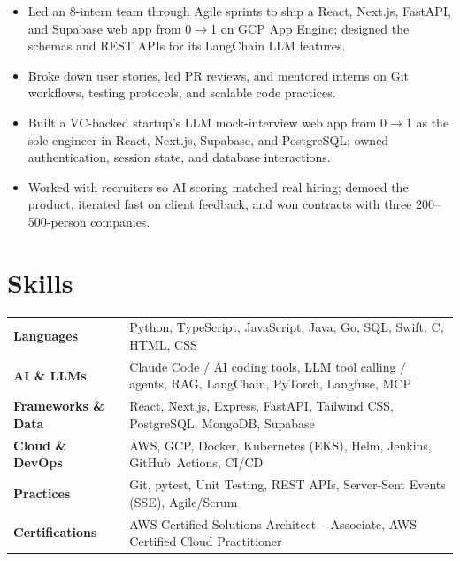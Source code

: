 \documentclass[11pt, letterpaper]{article}
\begin{document}
\vspace{1pt}
\begin{itemize}
  \item Led an 8-intern team through Agile sprints to ship a React, Next.js, FastAPI, and Supabase web app from 0$\to$1 on GCP App Engine; designed the schemas and REST APIs for its LangChain LLM features.
  \item Broke down user stories, led PR reviews, and mentored interns on Git workflows, testing protocols, and scalable code practices.
\end{itemize}

\begin{itemize}
  \item Built a VC-backed startup's LLM mock-interview web app from 0$\to$1 as the sole engineer in React, Next.js, Supabase, and PostgreSQL; owned authentication, session state, and database interactions.
  \item Worked with recruiters so AI scoring matched real hiring; demoed the product, iterated fast on client feedback, and won contracts with three 200--500-person companies.
\end{itemize}

\section{Skills}
\begin{tabularx}{\textwidth}{@{}l @{\hspace{7pt}} >{\raggedright\arraybackslash}X@{}}
  \textbf{Languages} & Python, TypeScript, JavaScript, Java, Go, SQL, Swift, C, HTML, CSS \\[1pt]
  \textbf{AI \& LLMs} & Claude Code / AI coding tools, LLM tool calling / agents, RAG, LangChain, PyTorch, Langfuse, MCP \\[1pt]
  \textbf{Frameworks \& Data} & React, Next.js, Express, FastAPI, Tailwind CSS, PostgreSQL, MongoDB, Supabase \\[1pt]
  \textbf{Cloud \& DevOps} & AWS, GCP, Docker, Kubernetes (EKS), Helm, Jenkins, GitHub~Actions, CI/CD \\[1pt]
  \textbf{Practices} & Git, pytest, Unit Testing, REST APIs, Server-Sent Events (SSE), Agile/Scrum \\[1pt]
  \textbf{Certifications} & AWS Certified Solutions Architect -- Associate, AWS Certified Cloud Practitioner \\
\end{tabularx}
\end{document}
